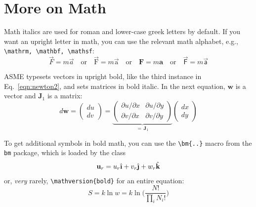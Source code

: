 \documentclass[subscriptcorrection,upint,varvw,mathalfa=cal=euler,barcolor=black,balance,hyphenate,french,pdf-a,nolists]{asmejour}
\begin{document}
\section{More on Math}
Math italics are used for roman and lower-case greek letters by default.  If you want an upright letter in math, you can use the relevant math alphabet, e.g., \verb|\mathrm, \mathbf, \mathsf|:
\begin{equation}\label{eqn:newton2}
\vec{F} = m \vec{a} \quad\textrm{or}\quad \vec{\mathrm{F}} = m \vec{\mathrm{a}} \quad\textrm{or}\quad \mathbf{F} = m \mathbf{a} \quad\textrm{or}\quad \vec{\mathsf{F}} = m \vec{\mathsf{a}}
\end{equation}

ASME typesets vectors in upright bold, like the third instance in Eq.\ \eqref{eqn:newton2}, and sets matrices in bold italic. In the next equation, $\mathbf{w}$ is a vector and  $\bm{J}_1$ is a matrix:
\begin{equation}\label{eqn:dw}
d\mathbf{w} =
   \begin{pmatrix}
 	du \\ dv
   \end{pmatrix} =
   \underbrace{\begin{pmatrix}
	 \partial u/\partial x &  \partial u/\partial y \\
	 \partial v/\partial x &  \partial v/\partial y
   \end{pmatrix}}_{=\,\bm{J}_1}  \begin{pmatrix}
 	dx \\ dy
   \end{pmatrix}
\end{equation}

To get additional symbols in bold math, you can use the \verb|\bm{..}| macro from the \texttt{bm} package, which is loaded by the class
\begin{equation}
\mathbf{u}_r = u_r\bm{\hat{\textbf{\i}}}+v_r\bm{\hat{\textbf{\j}}}+w_r\bm{\hat{\textbf{k}}}
\end{equation}
or, \textit{very} rarely, \verb|\mathversion{bold}| for an entire equation:
\begin{equation}
S = k \ln w = k \ln \biggl(\frac{N!}{\prod_i N_i!}\biggr)
\end{equation}
\end{document}
